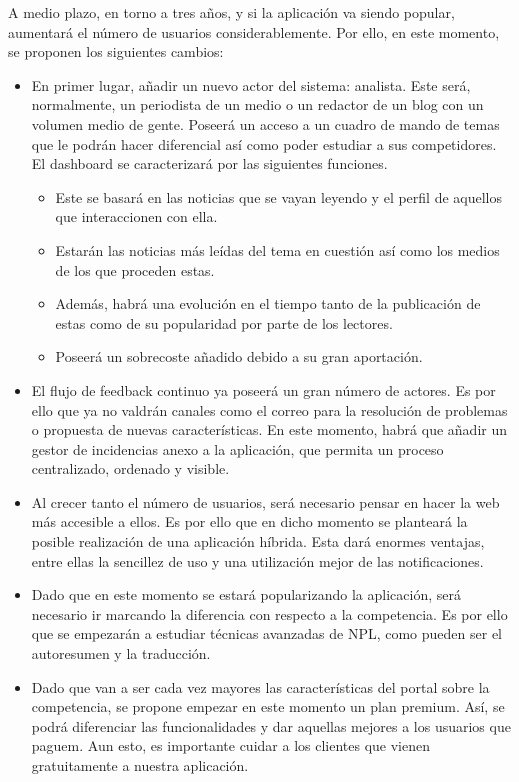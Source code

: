 A medio plazo, en torno a tres años, y si la aplicación va siendo popular, aumentará el número de usuarios considerablemente. Por ello, en este momento, se proponen los siguientes cambios:

\begin{itemize}
    \item En primer lugar, añadir un nuevo actor del sistema: analista. Este será, normalmente, un periodista de un medio o un redactor de un blog con un volumen medio de gente. Poseerá un acceso a un cuadro de mando de temas que le podrán hacer diferencial así como poder estudiar a sus competidores. El dashboard se caracterizará por las siguientes funciones.
    \begin{itemize}
        \item Este se basará en las noticias que se vayan leyendo y el perfil de aquellos que interaccionen con ella.
        \item Estarán las noticias más leídas del tema en cuestión así como los medios de los que proceden estas.
        \item Además, habrá una evolución en el tiempo tanto de la publicación de estas como de su popularidad por parte de los lectores.
        \item Poseerá un sobrecoste añadido debido a su gran aportación.
    \end{itemize}
    \item El flujo de feedback continuo ya poseerá un gran número de actores. Es por ello que ya no valdrán canales como el correo para la resolución de problemas o propuesta de nuevas características. En este momento, habrá que añadir un gestor de incidencias anexo a la aplicación, que permita un proceso centralizado, ordenado y visible.
    \item Al crecer tanto el número de usuarios, será necesario pensar en hacer la web más accesible a ellos. Es por ello que en dicho momento se planteará la posible realización de una aplicación híbrida. Esta dará enormes ventajas, entre ellas la sencillez de uso y una utilización mejor de las notificaciones.
    \item Dado que en este momento se estará popularizando la aplicación, será necesario ir marcando la diferencia con respecto a la competencia. Es por ello que se empezarán a estudiar técnicas avanzadas de NPL, como pueden ser el autoresumen y la traducción.
    \item Dado que van a ser cada vez mayores las características del portal sobre la competencia, se propone empezar en este momento un plan premium. Así, se podrá diferenciar las funcionalidades y dar aquellas mejores a los usuarios que paguem. Aun esto, es importante cuidar a los clientes que vienen gratuitamente a nuestra aplicación.
\end{itemize}

